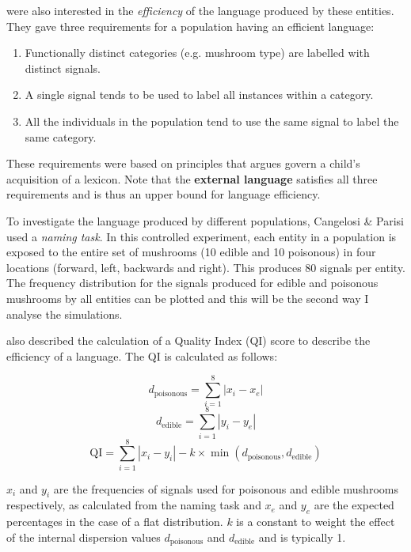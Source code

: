 \documentclass[12pt,a4paper]{report}
\begin{document}
\cite{Cangelosi1998} were also interested in the \emph{efficiency} of the language produced by these entities. They gave three requirements for a population having an efficient language:

\begin{enumerate}
	\item Functionally distinct categories (e.g. mushroom type) are labelled with distinct signals.
	\item A single signal tends to be used to label all instances within a category.
	\item All the individuals in the population tend to use the same signal to label the same category.
\end{enumerate}

These requirements were based on principles that \cite{Clark1995} argues govern a child's acquisition of a lexicon. Note that the {\bf external language} satisfies all three requirements and is thus an upper bound for language efficiency.

To investigate the language produced by different populations, Cangelosi \& Parisi used a \emph{naming task}. In this controlled experiment, each entity in a population is exposed to the entire set of mushrooms (10 edible and 10 poisonous) in four locations (forward, left, backwards and right). This produces 80 signals per entity. The frequency distribution for the signals produced for edible and poisonous mushrooms by all entities can be plotted and this will be the second way I analyse the simulations.

\citet{Cangelosi1998} also described the calculation of a Quality Index (QI) score to describe the efficiency of a language. The QI is calculated as follows:

\begin{equation}
\label{equation:dpoisonous}
d_{\mathrm{poisonous}} = \sum^{8}_{i = 1}{|x_i - x_e|}
\end{equation}
\begin{equation}
\label{equation:dedible}
d_{\mathrm{edible}} = \sum^{8}_{i = 1}{|y_i - y_e|}
\end{equation}
\begin{equation}
\label{equation:qi}
\mathrm{QI} = \sum^{8}_{i = 1} |x_i - y_i| - k \times \min (d_{\mathrm{poisonous}}, d_{\mathrm{edible}})
\end{equation}

$x_i$ and $y_i$ are the frequencies of signals used for poisonous and edible mushrooms respectively, as calculated from the naming task and $x_e$ and $y_e$ are the expected percentages in the case of a flat distribution. $k$ is a constant to weight the effect of the internal dispersion values $d_{\mathrm{poisonous}}$ and $d_{\mathrm{edible}}$ and is typically 1.
\end{document}
